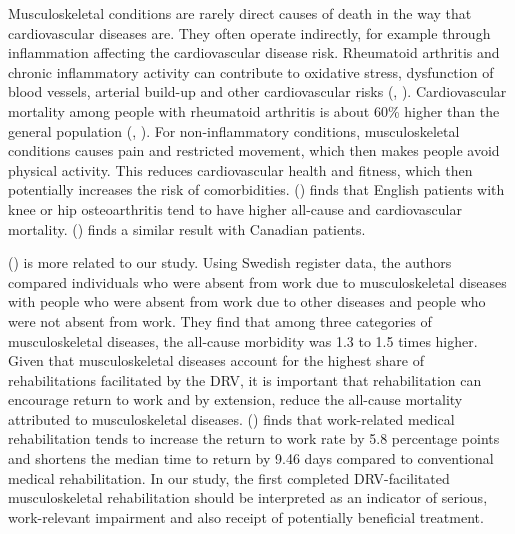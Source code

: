 \documentclass[a4paper,12pt]{article}
\theoremstyle{plain}
\theoremstyle{definition}
\theoremstyle{TheoremNum}
\theoremstyle{CorollaryNum}
\theoremstyle{PropositionNum}
\theoremstyle{TheoremNum}
\begin{document}
Musculoskeletal conditions are rarely direct causes of death in the way that cardiovascular diseases are. They often operate indirectly, for example through inflammation affecting the cardiovascular disease risk. Rheumatoid arthritis and chronic inflammatory activity can contribute to oxidative stress, dysfunction of blood vessels, arterial build-up and other cardiovascular risks (\citeauthor{england2018increased}, \citeyear{england2018increased}). Cardiovascular mortality among people with rheumatoid arthritis is about 60\% higher than the general population (\citeauthor{meulman2023estimating}, \citeyear{meune2009trends}). For non-inflammatory conditions, musculoskeletal conditions causes pain and restricted movement, which then makes people avoid physical activity. This reduces cardiovascular health and fitness, which then potentially increases the risk of comorbidities. \citeauthor{nuesch2011all} (\citeyear{nuesch2011all}) finds that English patients with knee or  hip osteoarthritis tend to have higher all-cause and cardiovascular mortality. \citeauthor{hawker2014allcause} (\citeyear{hawker2014allcause}) finds a similar result with Canadian patients. 

\citeauthor{jansson2012sickness} (\citeyear{jansson2012sickness}) is more related to our study. Using Swedish register data, the authors compared individuals who were absent from work due to musculoskeletal diseases with people who were absent from work due to other diseases and people who were not absent from work. They find that among three categories of musculoskeletal diseases, the all-cause morbidity was 1.3 to 1.5 times higher. Given that musculoskeletal diseases account for the highest share of rehabilitations facilitated by the DRV, it is important that rehabilitation can encourage return to work and by extension, reduce the all-cause mortality attributed to musculoskeletal diseases. \citeauthor{bethge2019effects} (\citeyear{bethge2019effects}) finds that work-related medical rehabilitation tends to increase the return to work rate by 5.8 percentage points and shortens the median time to return by 9.46 days compared to conventional medical rehabilitation. In our study, the first completed DRV-facilitated musculoskeletal rehabilitation should be interpreted as an indicator of serious, work-relevant impairment and also receipt of potentially beneficial treatment. 


\end{document}
